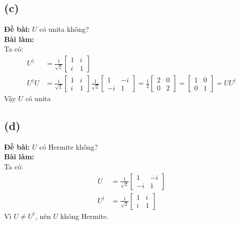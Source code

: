 \subsection{(c)}
\textbf{Đề bài:} $U$ có unita không?\\
\textbf{Bài làm:}\\
Ta có:
\begin{align*}
    U^\dagger   & = \frac{1}{\sqrt{2}}\begin{bmatrix}
                                          1 & i \\
                                          i & 1
                                      \end{bmatrix} \\
    U^\dagger U & = \frac{1}{\sqrt{2}}\begin{bmatrix}
                                          1 & i \\
                                          i & 1
                                      \end{bmatrix}
    \frac{1}{\sqrt{2}}\begin{bmatrix}
                          1  & -i \\
                          -i & 1
                      \end{bmatrix}
    = \frac{1}{2} \begin{bmatrix}
                      2 & 0 \\
                      0 & 2
                  \end{bmatrix} = \begin{bmatrix}
                                      1 & 0 \\
                                      0 & 1
                                  \end{bmatrix} = UU^\dagger
\end{align*}
Vậy $U$ có unita

\subsection{(d)}
\textbf{Đề bài:} $U$ có Hermite không?\\
\textbf{Bài làm:}\\
Ta có:
\begin{align*}
    U         & = \frac{1}{\sqrt{2}}\begin{bmatrix}
                                        1  & -i \\
                                        -i & 1
                                    \end{bmatrix} \\
    U^\dagger & = \frac{1}{\sqrt{2}}\begin{bmatrix}
                                        1 & i \\
                                        i & 1
                                    \end{bmatrix}
\end{align*}
Vì $U \ne U^\dagger$, nên $U$ không Hermite.

